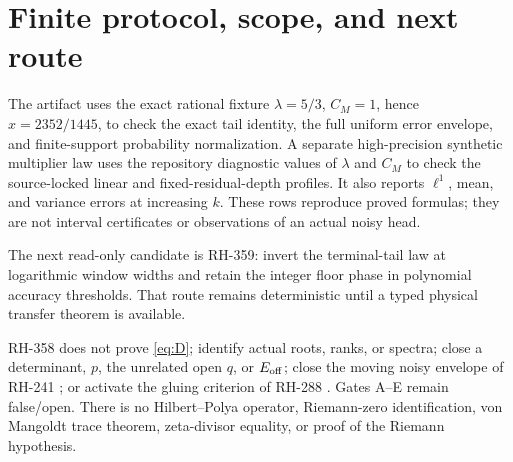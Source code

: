 \documentclass[11pt]{article}
\theoremstyle{remark}
\begin{document}
\section{Finite protocol, scope, and next route}

The artifact uses the exact rational fixture
$\lambda=5/3$, $C_M=1$, hence $x=2352/1445$, to check the exact tail identity,
the full uniform error envelope, and finite-support probability normalization.
A separate high-precision synthetic multiplier law uses the repository
diagnostic values of $\lambda$ and $C_M$ to check the source-locked linear and
fixed-residual-depth profiles.  It also reports $\ell^1$, mean, and variance
errors at increasing $k$.  These rows reproduce proved formulas; they are not
interval certificates or observations of an actual noisy head.

The next read-only candidate is RH-359: invert the terminal-tail law at
logarithmic window widths and retain the integer floor phase in polynomial
accuracy thresholds.  That route remains deterministic until a typed physical
transfer theorem is available.

RH-358 does not prove \eqref{eq:D}; identify actual roots, ranks, or spectra;
close a determinant, $p$, the unrelated open $q$, or $E_{\rm off}$; close the
moving noisy envelope of RH-241 \citep{WangEnvelopeReview2026}; or activate the
gluing criterion of RH-288 \citep{WangGluing2026}.  Gates A--E remain
false/open.  There is no Hilbert--Polya operator, Riemann-zero identification,
von Mangoldt trace theorem, zeta-divisor equality, or proof of the Riemann
hypothesis.



\end{document}
